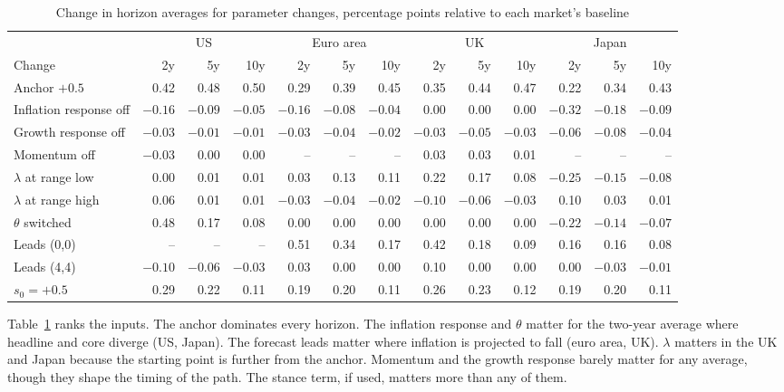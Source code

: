 \documentclass[11pt,a4paper]{article}
\begin{document}
\begin{table}[htbp]
\centering\footnotesize
\caption{Change in horizon averages for parameter changes, percentage points relative to each market's baseline}
\label{tab:sens}
\setlength\tabcolsep{3pt}
\begin{tabular}{@{}lrrrrrrrrrrrr@{}}
\toprule
 & \multicolumn{3}{c}{US} & \multicolumn{3}{c}{Euro area} & \multicolumn{3}{c}{UK} & \multicolumn{3}{c}{Japan} \\
\cmidrule(lr){2-4}\cmidrule(lr){5-7}\cmidrule(lr){8-10}\cmidrule(lr){11-13}
Change & 2y & 5y & 10y & 2y & 5y & 10y & 2y & 5y & 10y & 2y & 5y & 10y \\
\midrule
Anchor $+0.5$ & 0.42 & 0.48 & 0.50 & 0.29 & 0.39 & 0.45 & 0.35 & 0.44 & 0.47 & 0.22 & 0.34 & 0.43 \\
Inflation response off & $-0.16$ & $-0.09$ & $-0.05$ & $-0.16$ & $-0.08$ & $-0.04$ & 0.00 & 0.00 & 0.00 & $-0.32$ & $-0.18$ & $-0.09$ \\
Growth response off & $-0.03$ & $-0.01$ & $-0.01$ & $-0.03$ & $-0.04$ & $-0.02$ & $-0.03$ & $-0.05$ & $-0.03$ & $-0.06$ & $-0.08$ & $-0.04$ \\
Momentum off & $-0.03$ & 0.00 & 0.00 & -- & -- & -- & 0.03 & 0.03 & 0.01 & -- & -- & -- \\
$\lambda$ at range low & 0.00 & 0.01 & 0.01 & 0.03 & 0.13 & 0.11 & 0.22 & 0.17 & 0.08 & $-0.25$ & $-0.15$ & $-0.08$ \\
$\lambda$ at range high & 0.06 & 0.01 & 0.01 & $-0.03$ & $-0.04$ & $-0.02$ & $-0.10$ & $-0.06$ & $-0.03$ & 0.10 & 0.03 & 0.01 \\
$\theta$ switched & 0.48 & 0.17 & 0.08 & 0.00 & 0.00 & 0.00 & 0.00 & 0.00 & 0.00 & $-0.22$ & $-0.14$ & $-0.07$ \\
Leads (0,0) & -- & -- & -- & 0.51 & 0.34 & 0.17 & 0.42 & 0.18 & 0.09 & 0.16 & 0.16 & 0.08 \\
Leads (4,4) & $-0.10$ & $-0.06$ & $-0.03$ & 0.03 & 0.00 & 0.00 & 0.10 & 0.00 & 0.00 & 0.00 & $-0.03$ & $-0.01$ \\
$s_0=+0.5$ & 0.29 & 0.22 & 0.11 & 0.19 & 0.20 & 0.11 & 0.26 & 0.23 & 0.12 & 0.19 & 0.20 & 0.11 \\
\bottomrule
\end{tabular}
\end{table}

Table~\ref{tab:sens} ranks the inputs. The anchor dominates every horizon. The inflation response and $\theta$ matter for the two-year average where headline and core diverge (US, Japan). The forecast leads matter where inflation is projected to fall (euro area, UK). $\lambda$ matters in the UK and Japan because the starting point is further from the anchor. Momentum and the growth response barely matter for any average, though they shape the timing of the path. The stance term, if used, matters more than any of them.
\end{document}

